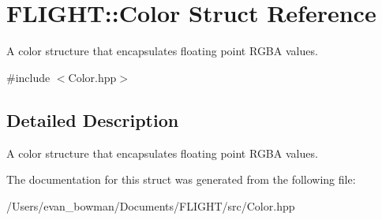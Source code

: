 \hypertarget{struct_f_l_i_g_h_t_1_1_color}{}\section{F\+L\+I\+G\+HT\+:\+:Color Struct Reference}
\label{struct_f_l_i_g_h_t_1_1_color}


A color structure that encapsulates floating point R\+G\+BA values.  




{\ttfamily \#include $<$Color.\+hpp$>$}



\subsection{Detailed Description}
A color structure that encapsulates floating point R\+G\+BA values. 

The documentation for this struct was generated from the following file\+:\begin{DoxyCompactItemize}
\item 
/\+Users/evan\+\_\+bowman/\+Documents/\+F\+L\+I\+G\+H\+T/src/Color.\+hpp\end{DoxyCompactItemize}
